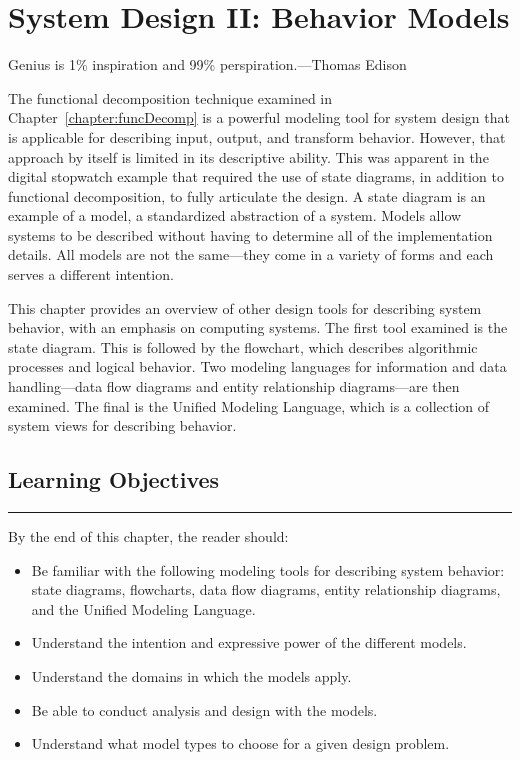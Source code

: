 \chapter{System Design II: Behavior Models}
\label{chapter:behaviorModels}
\graphicspath{ {./chapter06/Fig} }

\begin{itquote}
Genius is 1\% inspiration and 99\% perspiration.---Thomas Edison
\end{itquote}


The functional decomposition technique examined in 
Chapter~\ref{chapter:funcDecomp} is a
powerful modeling tool for system design that is applicable for
describing input, output, and transform behavior. However, that approach
by itself is limited in its descriptive ability. This was apparent in
the digital stopwatch example that required the use of state diagrams,
in addition to functional decomposition, to fully articulate the design.
A state diagram is an example of a model, a standardized abstraction of
a system. Models allow systems to be described without having to
determine all of the implementation details. All models are not the
same---they come in a variety of forms and each serves a different
intention.

This chapter provides an overview of other design tools for describing
system behavior, with an emphasis on computing systems. The first tool
examined is the state diagram. This is followed by the flowchart, which
describes algorithmic processes and logical behavior. Two modeling
languages for information and data handling---data flow diagrams and
entity relationship diagrams---are then examined. The final is the
Unified Modeling Language, which is a collection of system views for
describing behavior.

\section*{Learning Objectives}
\noindent\rule{\linewidth}{1pt}
By the end of this chapter, the reader should:

\begin{itemize}
\item
  Be familiar with the following modeling tools for describing system
  behavior: state diagrams, flowcharts, data flow diagrams, entity
  relationship diagrams, and the Unified Modeling Language.
\item
  Understand the intention and expressive power of the different models.
\item
  Understand the domains in which the models apply.
\item
  Be able to conduct analysis and design with the models.
\item
  Understand what model types to choose for a given design problem.
\end{itemize}

